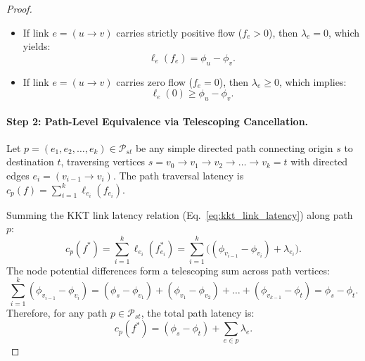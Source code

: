 \documentclass[11pt,a4paper]{article}
\begin{document}
\begin{proof}
\begin{itemize}
    \item If link $e = (u \to v)$ carries strictly positive flow ($f_e > 0$), then $\lambda_e = 0$, which yields:
    \begin{equation}
    \label{eq:active_edge_kkt}
    \ell_e(f_e) = \phi_u - \phi_v.
    \end{equation}
    \item If link $e = (u \to v)$ carries zero flow ($f_e = 0$), then $\lambda_e \ge 0$, which implies:
    \begin{equation}
    \label{eq:inactive_edge_kkt}
    \ell_e(0) \ge \phi_u - \phi_v.
    \end{equation}
\end{itemize}

\paragraph{Step 2: Path-Level Equivalence via Telescoping Cancellation.}
Let $p = (e_1, e_2, \dots, e_k) \in \mathcal{P}_{st}$ be any simple directed path connecting origin $s$ to destination $t$, traversing vertices $s = v_0 \to v_1 \to v_2 \to \dots \to v_k = t$ with directed edges $e_i = (v_{i-1} \to v_i)$. The path traversal latency is $c_p(f) = \sum_{i=1}^k \ell_{e_i}(f_{e_i})$.

Summing the KKT link latency relation (Eq.~\eqref{eq:kkt_link_latency}) along path $p$:
\begin{equation}
c_p(f^*) = \sum_{i=1}^k \ell_{e_i}(f_{e_i}^*) = \sum_{i=1}^k \big( (\phi_{v_{i-1}} - \phi_{v_i}) + \lambda_{e_i} \big).
\end{equation}
The node potential differences form a telescoping sum across path vertices:
\begin{equation}
\sum_{i=1}^k (\phi_{v_{i-1}} - \phi_{v_i}) = (\phi_s - \phi_{v_1}) + (\phi_{v_1} - \phi_{v_2}) + \dots + (\phi_{v_{k-1}} - \phi_t) = \phi_s - \phi_t.
\end{equation}
Therefore, for any path $p \in \mathcal{P}_{st}$, the total path latency is:
\begin{equation}
c_p(f^*) = (\phi_s - \phi_t) + \sum_{e \in p} \lambda_e.
\end{equation}


\end{proof}
\end{document}

